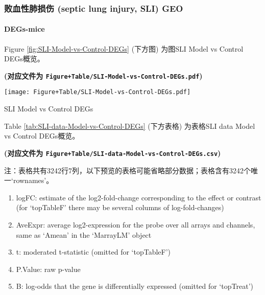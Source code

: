 \documentclass[
]{article}
\providecommand{\tightlist}{%
  \setlength{\itemsep}{0pt}\setlength{\parskip}{0pt}}
\begin{document}
\hypertarget{sli}{%
\subsubsection{败血性肺损伤 (septic lung injury, SLI) GEO}\label{sli}}

\hypertarget{degs-mice}{%
\paragraph{DEGs-mice}\label{degs-mice}}

Figure \ref{fig:SLI-Model-vs-Control-DEGs} (下方图) 为图SLI Model vs Control DEGs概览。

\textbf{(对应文件为 \texttt{Figure+Table/SLI-Model-vs-Control-DEGs.pdf})}

\def\@captype{figure}
\begin{center}
\texttt{[image: Figure+Table/SLI-Model-vs-Control-DEGs.pdf]}
\caption{SLI Model vs Control DEGs}\label{fig:SLI-Model-vs-Control-DEGs}
\end{center}

Table \ref{tab:SLI-data-Model-vs-Control-DEGs} (下方表格) 为表格SLI data Model vs Control DEGs概览。

\textbf{(对应文件为 \texttt{Figure+Table/SLI-data-Model-vs-Control-DEGs.csv})}

\begin{center}\begin{tcolorbox}[colback=gray!10, colframe=gray!50, width=0.9\linewidth, arc=1mm, boxrule=0.5pt]注：表格共有3242行7列，以下预览的表格可能省略部分数据；表格含有3242个唯一`rownames'。
\end{tcolorbox}
\end{center}
\begin{center}\begin{tcolorbox}[colback=gray!10, colframe=gray!50, width=0.9\linewidth, arc=1mm, boxrule=0.5pt]\begin{enumerate}\tightlist
\item logFC:  estimate of the log2-fold-change corresponding to the effect or contrast (for ‘topTableF’ there may be several columns of log-fold-changes)
\item AveExpr:  average log2-expression for the probe over all arrays and channels, same as ‘Amean’ in the ‘MarrayLM’ object
\item t:  moderated t-statistic (omitted for ‘topTableF’)
\item P.Value:  raw p-value
\item B:  log-odds that the gene is differentially expressed (omitted for ‘topTreat’)
\end{enumerate}\end{tcolorbox}
\end{center}
\end{document}
